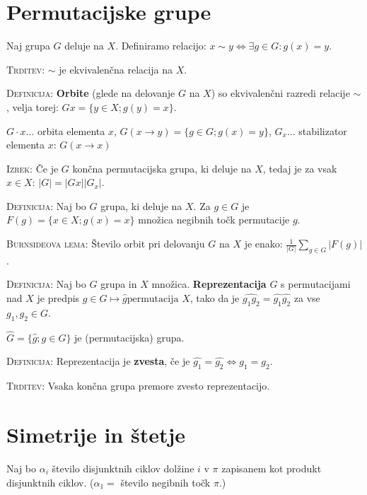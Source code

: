 \documentclass[8pt,a4paper]{amsart}
\theoremstyle{definition} %
\theoremstyle{plain} %
\begin{document}
\thispagestyle{empty}
\setlength{\parindent}{0pt}

\vspace{-2ex}
\section{Permutacijske grupe}

Naj grupa $G$ deluje na $X$. Definiramo relacijo: $x \sim y \Longleftrightarrow
\exists g \in G: g(x)=y$.

\textsc{Trditev:} $\sim$ je ekvivalenčna relacija na $X$.

\textsc{Definicija:} \textbf{Orbite} (glede na delovanje $G$ na $X$) so
ekvivalenčni razredi relacije $\sim$, velja torej: $Gx = \{ y \in X; g(y) = x
\}$.

$G\cdot x$... orbita elementa $x$, $G(x \rightarrow y) = \{ g \in G; g(x)=y \}$,
$G_x$... stabilizator elementa $x$: $G(x \rightarrow x)$

\textsc{Izrek:} Če je $G$ končna permutacijska grupa, ki deluje na $X$, tedaj je
za vsak $x \in X$:  $|G| = |Gx| |G_x|$.

\textsc{Definicija}: Naj bo $G$ grupa, ki deluje na $X$. Za $g \in G$ je $F(g) =
\{ x\in X; g(x) = x \}$ množica negibnih točk permutacije $g$.

\textsc{Burnsideova lema:} Število orbit pri delovanju $G$ na $X$ je enako:  $\frac{1}{|G|}
\sum_{g \in G}|F(g)|$.

\textsc{Definicija:} Naj bo $G$ grupa in $X$ množica. \textbf{Reprezentacija}
$G$ s permutacijami nad $X$ je predpis $g \in G \mapsto \hat{g} \text{
permutacija } X$, tako da je $\widehat{g_1g_2} = \widehat{g_1}\widehat{g_2}$ za
vse $g_1,g_2 \in G$.

$\widehat{G} = \{ \widehat{g} ; g\in G \}$ je (permutacijska) grupa.

\textsc{Definicija:} Reprezentacija je \textbf{zvesta}, če je $\widehat{g_1} =
\widehat{g_2} \Longleftrightarrow g_1 = g_2$.

\textsc{Trditev:} Vsaka končna grupa premore zvesto reprezentacijo.


\vspace{-2ex}
\section{Simetrije in štetje}

Naj bo $\alpha_i$ število disjunktnih ciklov dolžine $i$ v $\pi$ zapisanem kot
produkt disjunktnih ciklov. ($\alpha_1 = $ število negibnih točk $\pi$.)
\end{document}
